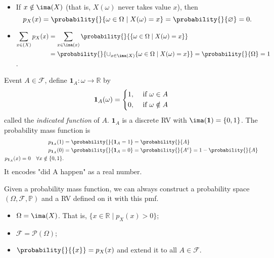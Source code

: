 \begin{note}
    \leavevmode
    \begin{itemize}
    \item If \(x \notin \ima(X)\) (that is, \(X(\omega)\) never takes value \(x\)), then
    \[p_X(x) = \probability{}{\omega \in \Omega\mid X(\omega) = x}=\probability{}{\varnothing} = 0.\]
    \item \(\begin{aligned}[t]\sum\limits_{x\in (X)}p_X(x) &= \sum\limits_{x\in \ima(x)}\probability{}{\{\omega \in \Omega\mid X(\omega) = x\}}\\
    &=\probability{}{\cup_{x\in \ima(X)}\{\omega\in \Omega\mid X(\omega)=x\}}=\probability{}{\Omega} = 1 \end{aligned}\).
    \end{itemize}
\end{note}
\begin{example}
    Event \(A\in \mathcal{F} \), define \(\mathbf{1}_A:\omega \to \mathbb{R}\) by
    \[
    \textbf{1}_A(\omega) = \begin{dcases}
        1, &\text{ if } \omega \in A\\
        0, &\text{ if }\omega \notin A \\
    \end{dcases}
    \]
    called the \textit{indicated function} of \(A\). \(\textbf{1}_{A}\) is a discrete RV with \(\ima(\textbf{1}) = \{0,1\}\). The probability mass function is
    \begin{align*}
        p_{\textbf{1}_A}(1) &= \probability{}{\textbf{1}_A = 1} = \probability{}{A}\\
        p_{\textbf{1}_A}(0) &= \probability{}{\textbf{1}_A = 0} = \probability{}{A^c} = 1 - \probability{}{A} \\
        p_{\textbf{1}_A}(x) = 0 \quad \forall x \notin \{0,1\}.
    \end{align*}
    It encodes "did A happen" as a real number.
\end{example}
\begin{remark}
    Given a probability mass function, we can always construct a probability space \((\Omega, \mathcal{F}, \mathbb{P})\) and a RV defined on it with this pmf.
    \begin{itemize}
    \item \(\Omega = \ima(X)\). That is, \(\{x \in \mathbb{R}\mid p_X(x) > 0\}\);
    \item \(\mathcal{F} = \mathcal{P}(\Omega)\);
    \item \(\probability{}{\{x\}} = p_X(x)\) and extend it to all \(A \in \mathcal{F}\).
    \end{itemize}
\end{remark}